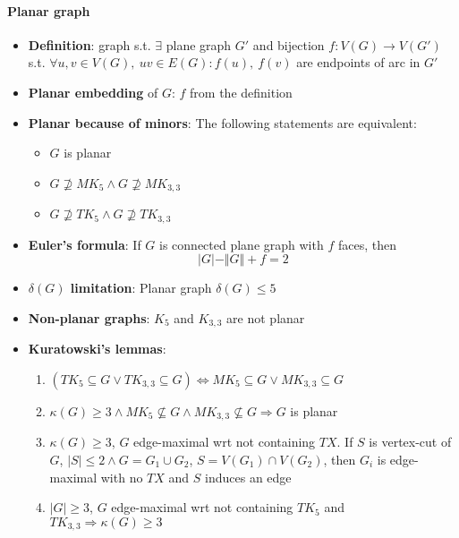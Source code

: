 \paragraph{Planar graph}
\begin{itemize}
  \item \textbf{Definition}: graph s.t. $ \exists $ plane graph $ G' $ and bijection $ f: V(G) \to V(G') $ s.t. $ \forall u,v \in V(G), \ uv \in E(G) : f(u), \ f(v) $ are endpoints of arc in $ G' $
  \item \textbf{Planar embedding} of $ G $: $ f $ from the definition
  \item \textbf{Planar because of minors}: The following statements are equivalent:
  \begin{itemize}
    \item $ G $ is planar 
    \item $ G \not \supseteq MK_5 \wedge G \not \supseteq MK_{3,3} $
    \item $ G \not \supseteq TK_5 \wedge G \not \supseteq TK_{3,3} $
  \end{itemize}
  \item \textbf{Euler's formula}: If $ G $ is connected plane graph with $ f $ faces, then
    \begin{equation*}
      \vert G \vert - \Vert G \Vert + f = 2
    \end{equation*}
  \item \textbf{$ \delta(G) $ limitation}: Planar graph $ \delta(G) \leq 5 $
  \item \textbf{Non-planar graphs}: $ K_5 $ and $ K_{3,3} $ are not planar
  \item \textbf{Kuratowski's lemmas}:
  \begin{enumerate}
    \item $ (TK_5 \subseteq G \vee TK_{3,3} \subseteq G) \Leftrightarrow MK_5 \subseteq G \vee MK_{3,3} \subseteq G $ 
    \item $ \kappa(G) \geq 3 \wedge MK_5 \not \subseteq G \wedge MK_{3,3} \not \subseteq G \Rightarrow G $ is planar
    \item $ \kappa(G) \geq 3 $, $ G $ edge-maximal wrt not containing $ TX $. If $ S $ is vertex-cut of $ G $, $ \vert S \vert \leq 2 \wedge G = G_1 \cup G_2 $, $ S = V(G_1) \cap V(G_2) $, then $ G_i $ is edge-maximal with no $ TX $ and $ S $ induces an edge
    \item $ \vert G \vert \geq 3 $, $ G $ edge-maximal wrt not containing $ TK_5 $ and $ TK_{3,3} \Rightarrow \kappa(G) \geq 3 $
  \end{enumerate}

\end{itemize}
